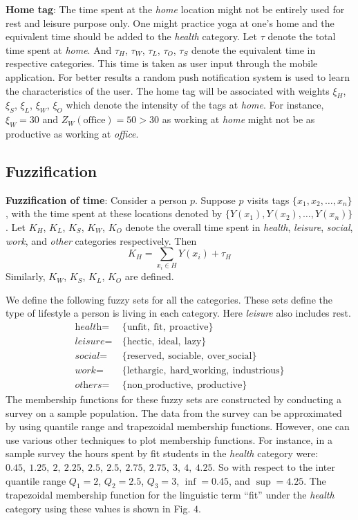 \documentclass[conference]{IEEEtran}
\newcommand{\quotes}[1]{``#1''}
\begin{document}
\textbf{Home tag}: The time spent at the \textit{home} location might not be entirely used for rest and leisure purpose only. One might practice yoga at one\rq s home and the equivalent time should be added to the \textit{health} category. Let $\tau$ denote the total time spent at \textit{home}. And $\tau_H$, $\tau_W$, $\tau_L$, $\tau_O$, $\tau_S$ denote the equivalent time in respective categories. This time is taken as user input through the mobile application. For better results a random push notification system is used to learn the characteristics of the user. The home tag will be associated with weights $\xi_H$, $\xi_S$, $\xi_L$, $\xi_W$, $\xi_O$ which denote the intensity of the tags at \textit{home}. For instance, $\xi_W=30$ and $Z_W(\text{office}) = 50 > 30$ as working at \textit{home} might not be as productive as working at \textit{office}.

\subsection{Fuzzification}

\textbf{Fuzzification of time}: Consider a person $p$. Suppose $p$ visits tags $\{x_1, x_2, \ldots, x_n\}$, with the time spent at these locations denoted by $\{Y(x_1), Y(x_2), \ldots, Y(x_n)\}$. Let $K_H$, $K_L$, $K_S$, $K_W$, $K_O$ denote the overall time spent in \textit{health}, \textit{leisure}, \textit{social}, \textit{work}, and \textit{other} categories respectively. Then 
\[
K_H = \sum_{x_i \in H}Y(x_i) + \tau_H
\]
Similarly, $K_W$, $K_S$, $K_L$, $K_O$ are defined.

We define the following fuzzy sets for all the categories. These sets define the type of lifestyle a person is living in each category. Here \textit{leisure} also includes rest.
\begin{align*}
\textit{health}=&\ \{\text{unfit},\ \text{fit},\ \text{proactive}\}\\
\textit{leisure}=&\ \{\text{hectic},\ \text{ideal},\ \text{lazy}\}\\
\textit{social}=&\ \{\text{reserved},\ \text{sociable},\ \text{over\_social}\}\\
\textit{work}=&\ \{\text{lethargic},\ \text{hard\_working},\ \text{industrious}\}\\
\textit{others}=&\ \{\text{non\_productive},\ \text{productive}\}
\end{align*}
The membership functions for these fuzzy sets are constructed by conducting a survey on a sample population. The data from the survey can be approximated by using quantile range and trapezoidal membership functions. However, one can use various other techniques to plot membership functions. For instance, in a sample survey the hours spent by fit students in the \textit{health} category were: $0.45,\ 1.25,\ 2,\ 2.25,\ 2.5,\ 2.5,\ 2.75,\ 2.75,\ 3,\ 4,\ 4.25$. So with respect to the inter quantile range $Q_1 = 2$, $Q_2 = 2.5$, $Q_3 = 3$, $\inf = 0.45$, and $\sup = 4.25$. The trapezoidal membership function for the linguistic term \quotes{fit} under the \textit{health} category using these values is shown in Fig. $4$.
\end{document}
